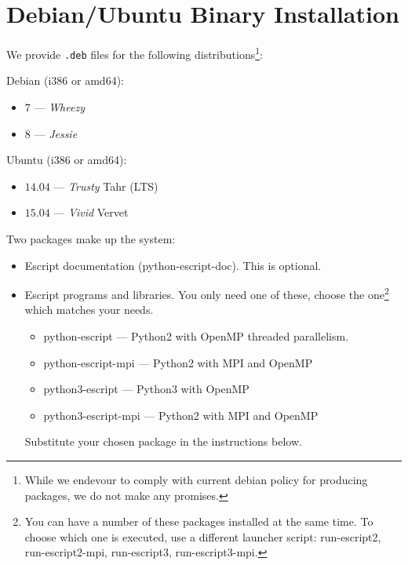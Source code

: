%
%
%



\chapter{Debian/Ubuntu Binary Installation}\label{chap:bin}

We provide \texttt{.deb} files for the following distributions\footnote{While we endevour to comply with current debian policy 
for producing packages, we do not make any promises.}:

Debian (i386 or amd64):
\begin{itemize}
 \item $7$ --- \emph{Wheezy}
 \item $8$ --- \emph{Jessie}
\end{itemize}

Ubuntu (i386 or amd64):
\begin{itemize}
 \item $14.04$ --- \emph{Trusty} Tahr (LTS)
 \item $15.04$ --- \emph{Vivid} Vervet
\end{itemize}

Two packages make up the \escript system:
\begin{itemize}
 \item Escript documentation (python-escript-doc). This is optional.
 \item Escript programs and libraries. You only need one of these, choose the one\footnote{You can 
 have a number of these packages installed at the same time. To choose which one is executed, 
 use a different launcher script: run-escript2, run-escript2-mpi, run-escript3, run-escript3-mpi.} which matches your needs.
 \begin{itemize}
  \item python-escript --- Python2 with OpenMP threaded parallelism.
  \item python-escript-mpi --- Python2 with MPI and OpenMP
  \item python3-escript --- Python3 with OpenMP
  \item python3-escript-mpi --- Python2 with MPI and OpenMP
 \end{itemize}
 Substitute your chosen package in the instructions below.
\end{itemize}

